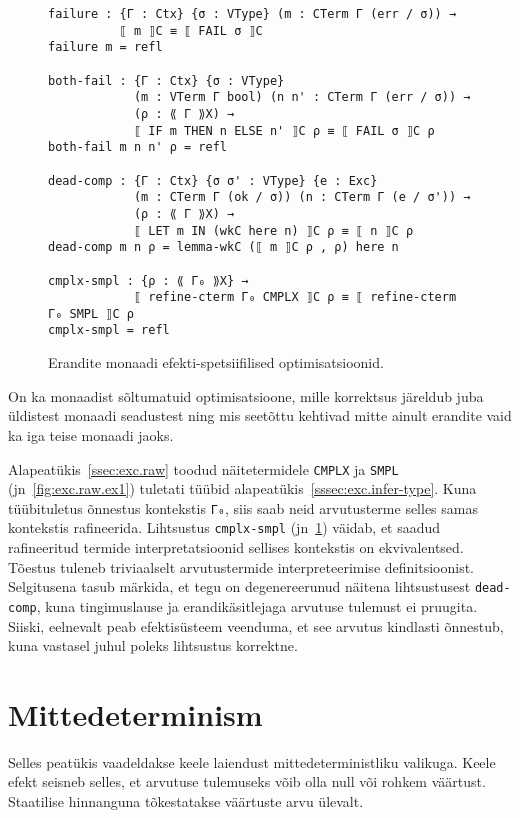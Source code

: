 \documentclass[a4paper,12pt]{article}
\begin{document}
\begin{figure}
  \begin{BVerbatim}
failure : {Γ : Ctx} {σ : VType} (m : CTerm Γ (err / σ)) →
          ⟦ m ⟧C ≡ ⟦ FAIL σ ⟧C
failure m = refl

both-fail : {Γ : Ctx} {σ : VType}
            (m : VTerm Γ bool) (n n' : CTerm Γ (err / σ)) →
            (ρ : ⟪ Γ ⟫X) → 
            ⟦ IF m THEN n ELSE n' ⟧C ρ ≡ ⟦ FAIL σ ⟧C ρ
both-fail m n n' ρ = refl

dead-comp : {Γ : Ctx} {σ σ' : VType} {e : Exc}
            (m : CTerm Γ (ok / σ)) (n : CTerm Γ (e / σ')) →
            (ρ : ⟪ Γ ⟫X) → 
            ⟦ LET m IN (wkC here n) ⟧C ρ ≡ ⟦ n ⟧C ρ
dead-comp m n ρ = lemma-wkC (⟦ m ⟧C ρ , ρ) here n

cmplx-smpl : {ρ : ⟪ Γ₀ ⟫X} →
            ⟦ refine-cterm Γ₀ CMPLX ⟧C ρ ≡ ⟦ refine-cterm Γ₀ SMPL ⟧C ρ
cmplx-smpl = refl
  \end{BVerbatim}
  \caption{Erandite monaadi efekti-spetsiifilised optimisatsioonid.}
  \label{fig:exc.opt2}
\end{figure}

On ka monaadist sõltumatuid optimisatsioone, mille korrektsus järeldub juba üldistest monaadi seadustest ning mis seetõttu kehtivad mitte ainult erandite vaid ka iga teise monaadi jaoks.

Alapeatükis~\ref{ssec:exc.raw} toodud näitetermidele {\tt CMPLX} ja {\tt SMPL} (jn~\ref{fig:exc.raw.ex1}) tuletati tüübid alapeatükis~\ref{sssec:exc.infer-type}.
Kuna tüübituletus õnnestus kontekstis {\tt Γ₀}, siis saab neid arvutusterme selles samas kontekstis rafineerida.
Lihtsustus {\tt cmplx-smpl} (jn~\ref{fig:exc.opt2}) väidab, et saadud rafineeritud termide interpretatsioonid sellises kontekstis on ekvivalentsed.
Tõestus tuleneb triviaalselt arvutustermide interpreteerimise definitsioonist.
Selgitusena tasub märkida, et tegu on degenereerunud näitena lihtsustusest {\tt dead-comp}, kuna tingimuslause ja erandikäsitlejaga arvutuse tulemust ei pruugita.
Siiski, eelnevalt peab efektisüsteem veenduma, et see arvutus kindlasti õnnestub, kuna vastasel juhul poleks lihtsustus korrektne.

\clearpage\vspace*{0pt}

\section{Mittedeterminism}

Selles peatükis vaadeldakse keele laiendust mittedeterministliku valikuga.
Keele efekt seisneb selles, et arvutuse tulemuseks võib olla null või rohkem väärtust.
Staatilise hinnanguna tõkestatakse väärtuste arvu ülevalt.
\end{document}
